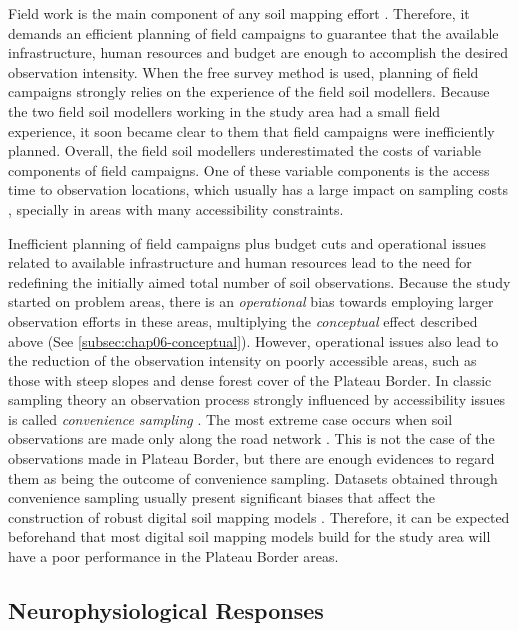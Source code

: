 Field work is the main component of any soil mapping effort \cite{KempenEtAl2012}. Therefore, it demands an 
efficient planning of field campaigns to guarantee that the available infrastructure, human resources and 
budget are enough to accomplish the desired observation intensity. When the free survey method is used, 
planning of field campaigns strongly relies on the experience of the field soil modellers. Because the two 
field soil modellers working in the study area had a small field experience, it soon became clear to them
that field campaigns were inefficiently planned. Overall, the field soil modellers underestimated the costs of
variable components of field campaigns. One of these variable components is the access time to observation 
locations, which usually has a large impact on sampling costs \cite{DomburgEtAl1997}, specially in areas with 
many accessibility constraints.

Inefficient planning of field campaigns plus budget cuts and operational issues related to available 
infrastructure and human resources lead to the need for redefining the initially aimed total number of soil 
observations. Because the study started on problem areas, there is an \emph{operational} bias towards employing
larger observation efforts in these areas, multiplying the \emph{conceptual} effect described above (See 
\autoref{subsec:chap06-conceptual}). However, operational issues also lead to the reduction of the 
observation intensity on poorly accessible areas, such as those with steep slopes and dense forest cover of the 
Plateau Border. In classic sampling theory an observation process strongly influenced by accessibility issues 
is called \emph{convenience sampling} \cite{deGruijterEtAl2006}. The most extreme case occurs when soil 
observations are made only along the road network \cite{CambuleEtAl2013}. This is not the case of the 
observations made in Plateau Border, but there are enough evidences to regard them as being the outcome of 
convenience sampling. Datasets obtained through convenience sampling usually present significant biases that 
affect the construction of robust digital soil mapping models \cite{BrusEtAl2011}. Therefore, it can be 
expected beforehand that most digital soil mapping models build for the study area will have a poor performance 
in the Plateau Border areas.

\subsection{Neurophysiological Responses}

